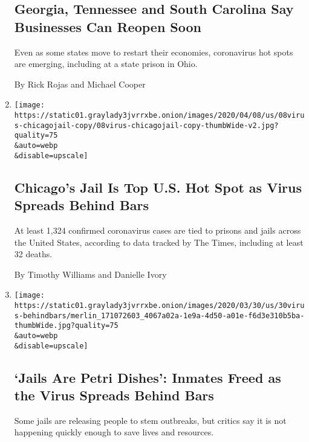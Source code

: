 \begin{enumerate}
  \hypertarget{georgia-tennessee-and-south-carolina-say-businesses-can-reopen-soon}{%
  \subsection{Georgia, Tennessee and South Carolina Say Businesses Can
  Reopen
  Soon}\label{georgia-tennessee-and-south-carolina-say-businesses-can-reopen-soon}}

  Even as some states move to restart their economies, coronavirus hot
  spots are emerging, including at a state prison in Ohio.

  By Rick Rojas and Michael Cooper
\item
  \href{/2020/04/08/us/coronavirus-cook-county-jail-chicago.html}{}

  \texttt{[image: https://static01.graylady3jvrrxbe.onion/images/2020/04/08/us/08virus-chicagojail-copy/08virus-chicagojail-copy-thumbWide-v2.jpg?quality=75\\\&auto=webp\\\&disable=upscale]}

  \hypertarget{chicagos-jail-is-top-us-hot-spot-as-virus-spreads-behind-bars}{%
  \subsection{Chicago's Jail Is Top U.S. Hot Spot as Virus Spreads
  Behind
  Bars}\label{chicagos-jail-is-top-us-hot-spot-as-virus-spreads-behind-bars}}

  At least 1,324 confirmed coronavirus cases are tied to prisons and
  jails across the United States, according to data tracked by The
  Times, including at least 32 deaths.

  By Timothy Williams and Danielle Ivory
\item
  \href{/2020/03/30/us/coronavirus-prisons-jails.html}{}

  \texttt{[image: https://static01.graylady3jvrrxbe.onion/images/2020/03/30/us/30virus-behindbars/merlin\_171072603\_4067a02a-1e9a-4d50-a01e-f6d3e310b5ba-thumbWide.jpg?quality=75\\\&auto=webp\\\&disable=upscale]}

  \hypertarget{jails-are-petri-dishes-inmates-freed-as-the-virus-spreads-behind-bars}{%
  \subsection{`Jails Are Petri Dishes': Inmates Freed as the Virus
  Spreads Behind
  Bars}\label{jails-are-petri-dishes-inmates-freed-as-the-virus-spreads-behind-bars}}

  Some jails are releasing people to stem outbreaks, but critics say it
  is not happening quickly enough to save lives and resources.


\end{enumerate}
